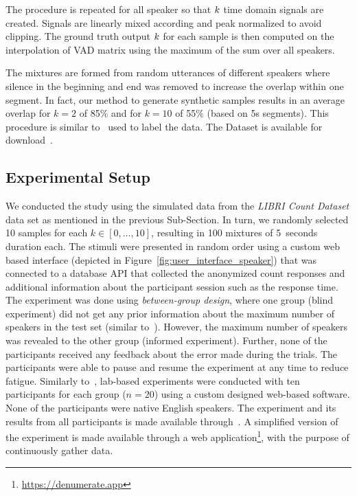 The procedure is repeated for all speaker so that \(k \) time domain signals are created.
Signals are linearly mixed according and peak normalized to avoid clipping.
The ground truth output \(k \) for each sample is then computed on the interpolation of VAD matrix using the maximum of the sum over all speakers.
\par
The mixtures are formed from random utterances of different speakers where silence in the beginning and end was removed to increase the overlap within one segment.
In fact, our method to generate synthetic samples results in an average overlap for \(k=2\) of 85\% and for \(k=10\) of 55\% (based on 5s segments).
This procedure is similar to~\cite{mesaros17} used to label the data.
The Dataset is available for download~\cite{oss_libricount}.

\subsection{Experimental Setup}

We conducted the study using the simulated data from the \emph{LIBRI Count Dataset} data set as mentioned in the previous Sub-Section.
In turn, we randomly selected 10 samples for each \(k \in [0, \ldots, 10]\), resulting in 100 mixtures of 5~seconds duration each.
The stimuli were presented in random order using a custom web based interface (depicted in Figure~\ref{fig:user_interface_speaker}) that was connected to a database API that collected the anonymized count responses and additional information about the participant session such as the response time.
The experiment was done using \emph{between-group design}, where one group (blind experiment) did not get any prior information about the maximum number of speakers in the test set (similar to~\cite{kawashima15}).
However, the maximum number of speakers was revealed to the other group (informed experiment).
Further, none of the participants received any feedback about the error made during the trials.
The participants were able to pause and resume the experiment at any time to reduce fatigue.
Similarly to~\cite{kawashima15}, lab-based experiments were conducted with ten participants for each group (\(n=20\)) using a custom designed web-based software.
None of the participants were native English speakers.
The experiment and its results from all participants is made available through~\cite{oss_countit}.
A simplified version of the experiment is made available through a web application\footnote{\url{https://denumerate.app}}, with the purpose of continuously gather data.

